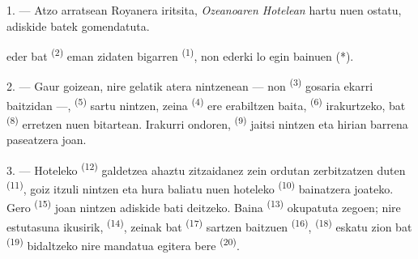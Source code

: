 %
%


\VUsaut{3.0mm}
\VUsaut{1.6mm}
\VUsaut{2.0mm}
\VUsaut{3.4mm}

1. --- Atzo arratsean Royanera iritsita, \textit{Ozeanoaren Hotelean} hartu nuen
ostatu, adiskide batek gomendatuta.

 eder bat \textsuperscript{(2)} eman zidaten bigarren
 \textsuperscript{(1)}, non ederki lo egin bainuen (*).

2. --- Gaur goizean, nire gelatik atera nintzenean --- non 
\textsuperscript{(3)} gosaria ekarri baitzidan ---, 
\textsuperscript{(5)} sartu nintzen, zeina 
\textsuperscript{(4)} ere erabiltzen baita, 
\textsuperscript{(6)} irakurtzeko,  bat
\textsuperscript{(8)} erretzen nuen bitartean. Irakurri ondoren,
 \textsuperscript{(9)} jaitsi nintzen eta hirian barrena
paseatzera joan.

3. --- Hoteleko  \textsuperscript{(12)} galdetzea ahaztu
zitzaidanez zein ordutan zerbitzatzen duten 
\textsuperscript{(11)}, goiz itzuli nintzen eta hura baliatu nuen hoteleko
 \textsuperscript{(10)} bainatzera joateko. Gero
 \textsuperscript{(15)} joan nintzen adiskide bati deitzeko. Baina
 \textsuperscript{(13)} okupatuta zegoen; nire estutasuna
ikusirik,  \textsuperscript{(14)}, zeinak 
bat \textsuperscript{(17)} sartzen baitzuen 
\textsuperscript{(16)},  \textsuperscript{(18)} eskatu zion
 bat \textsuperscript{(19)} bidaltzeko nire mandatua egitera bere
 \textsuperscript{(20)}.

